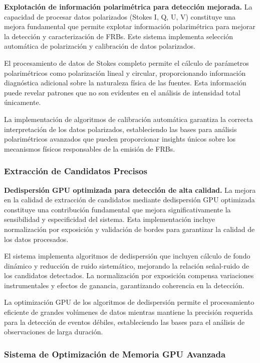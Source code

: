 \noindent\textbf{Explotación de información polarimétrica para detección mejorada.} La capacidad de procesar datos polarizados (Stokes I, Q, U, V) constituye una mejora fundamental que permite explotar información polarimétrica para mejorar la detección y caracterización de FRBs. Este sistema implementa selección automática de polarización y calibración de datos polarizados.

El procesamiento de datos de Stokes completo permite el cálculo de parámetros polarimétricos como polarización lineal y circular, proporcionando información diagnóstica adicional sobre la naturaleza física de las fuentes. Esta información puede revelar patrones que no son evidentes en el análisis de intensidad total únicamente.

La implementación de algoritmos de calibración automática garantiza la correcta interpretación de los datos polarizados, estableciendo las bases para análisis polarimétricos avanzados que pueden proporcionar insights únicos sobre los mecanismos físicos responsables de la emisión de FRBs.

\subsubsection{Extracción de Candidatos Precisos}

\noindent\textbf{Dedispersión GPU optimizada para detección de alta calidad.} La mejora en la calidad de extracción de candidatos mediante dedispersión GPU optimizada constituye una contribución fundamental que mejora significativamente la sensibilidad y especificidad del sistema. Esta implementación incluye normalización por exposición y validación de bordes para garantizar la calidad de los datos procesados.

El sistema implementa algoritmos de dedispersión que incluyen cálculo de fondo dinámico y reducción de ruido sistemático, mejorando la relación señal-ruido de los candidatos detectados. La normalización por exposición compensa variaciones instrumentales y efectos de ganancia, garantizando coherencia en la detección.

La optimización GPU de los algoritmos de dedispersión permite el procesamiento eficiente de grandes volúmenes de datos mientras mantiene la precisión requerida para la detección de eventos débiles, estableciendo las bases para el análisis de observaciones de larga duración.

\subsubsection{Sistema de Optimización de Memoria GPU Avanzada}

